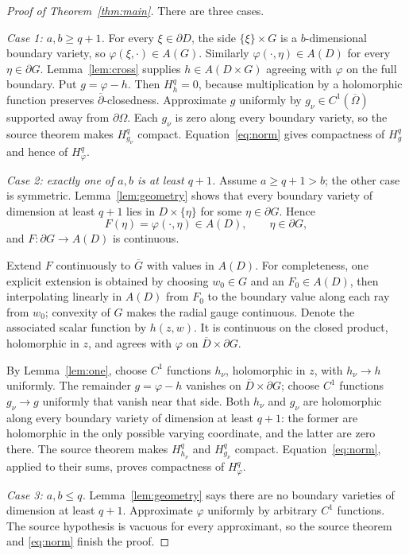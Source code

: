 \documentclass[11pt]{article}
\newcommand{\dbar}{\overline\partial}
\newcommand{\bd}{\partial}
\newcommand{\cl}[1]{\overline{#1}}
\begin{document}
\begin{proof}[Proof of Theorem~\ref{thm:main}]
There are three cases.

\smallskip
\noindent\emph{Case 1: $a,b\geq q+1$.}
For every $\xi\in\bd D$, the side $\{\xi\}\times G$ is a $b$-dimensional
boundary variety, so $\varphi(\xi,\cdot)\in A(G)$.  Similarly
$\varphi(\cdot,\eta)\in A(D)$ for every $\eta\in\bd G$.
Lemma~\ref{lem:cross} supplies $h\in A(D\times G)$ agreeing with $\varphi$
on the full boundary.  Put $g=\varphi-h$.  Then $H_h^q=0$, because
multiplication by a holomorphic function preserves $\dbar$-closedness.
Approximate $g$ uniformly by $g_\nu\in C^1(\cl\Omega)$ supported away from
$\bd\Omega$.  Each $g_\nu$ is zero along every boundary variety, so the
source theorem makes $H_{g_\nu}^q$ compact.  Equation~\eqref{eq:norm} gives
compactness of $H_g^q$ and hence of $H_\varphi^q$.

\smallskip
\noindent\emph{Case 2: exactly one of $a,b$ is at least $q+1$.}
Assume $a\geq q+1>b$; the other case is symmetric.  Lemma~\ref{lem:geometry}
shows that every boundary variety of dimension at least $q+1$ lies in
$D\times\{\eta\}$ for some $\eta\in\bd G$.  Hence
\[
             F(\eta)=\varphi(\cdot,\eta)\in A(D),
             \qquad \eta\in\bd G,
\]
and $F:\bd G\to A(D)$ is continuous.

Extend $F$ continuously to $\cl G$ with values in $A(D)$.  For completeness,
one explicit extension is obtained by choosing $w_0\in G$ and an
$F_0\in A(D)$, then interpolating linearly in $A(D)$ from $F_0$ to the
boundary value along each ray from $w_0$; convexity of $G$ makes the radial
gauge continuous.  Denote the associated scalar function by $h(z,w)$.
It is continuous on the closed product, holomorphic in $z$, and agrees with
$\varphi$ on $\cl D\times\bd G$.

By Lemma~\ref{lem:one}, choose $C^1$ functions $h_\nu$, holomorphic in $z$,
with $h_\nu\to h$ uniformly.  The remainder $g=\varphi-h$ vanishes on
$\cl D\times\bd G$; choose $C^1$ functions $g_\nu\to g$ uniformly that
vanish near that side.  Both $h_\nu$ and $g_\nu$ are holomorphic along every
boundary variety of dimension at least $q+1$: the former are holomorphic in
the only possible varying coordinate, and the latter are zero there.
The source theorem makes $H_{h_\nu}^q$ and $H_{g_\nu}^q$ compact.
Equation~\eqref{eq:norm}, applied to their sums, proves compactness of
$H_\varphi^q$.

\smallskip
\noindent\emph{Case 3: $a,b\leq q$.}
Lemma~\ref{lem:geometry} says there are no boundary varieties of dimension
at least $q+1$.  Approximate $\varphi$ uniformly by arbitrary $C^1$
functions.  The source hypothesis is vacuous for every approximant, so the
source theorem and \eqref{eq:norm} finish the proof.
\end{proof}
\end{document}
